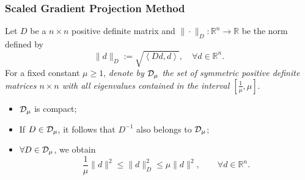 \documentclass[xcolor=dvipsnames,aspectratio=169,13pt]{beamer} %
\begin{document}
\begin{frame}
  \frametitle{Scaled Gradient Projection Method}
  Let  $D$ be a $n\times n$ positive definite matrix and $\| \cdot \|_{D} : \mathbb{R}^{n}\rightarrow \mathbb{R}$ be  the norm  defined by
  \begin{equation*} 
    \|d\|_{D}:=\sqrt{\left\langle D d,d\right\rangle},\quad \forall d\in \mathbb{R}^{n}.
  \end{equation*}
  For a fixed  constant $\mu \geq 1$,  {\it denote by  ${\cal D}_{\mu}$  the set of symmetric positive definite matrices $n\times n$ with all eigenvalues contained in the interval $[\frac{1}{\mu}, \mu]$}.
  \begin{itemize}
    \item ${\cal D}_{\mu}$   is compact;
    \item If $D\in {\cal D}_{\mu}$, it follows that $D^{-1}$ also belongs to $ {\cal D}_{\mu}$;
    \item $\forall D\in {\cal D}_{\mu}$,  we obtain
          \begin{equation*} 
            \frac{1}{\mu}\|d\|^2\leq \|d\|^2_{D}\leq \mu \|d\|^2, \qquad \forall d\in \mathbb{R}^n.
          \end{equation*}
  \end{itemize}
\end{frame}






\end{document}
